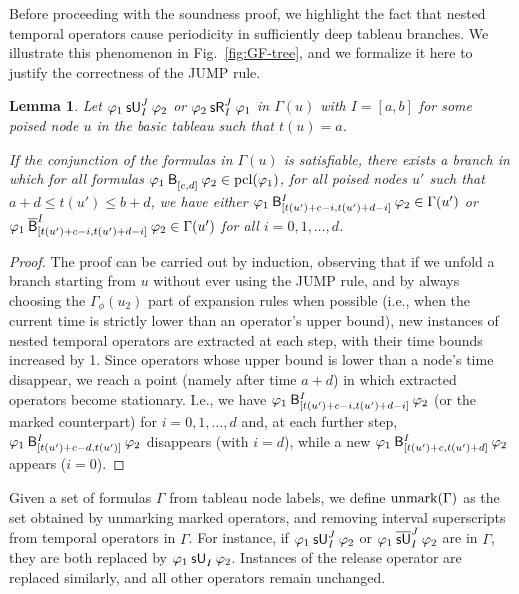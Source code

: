 \documentclass[acmsmall,screen]{acmart}
\newtheorem{lemma}{Lemma}
\begin{document}
Before proceeding with the soundness proof, we highlight the fact that nested temporal operators cause periodicity in sufficiently deep tableau branches.
We illustrate this phenomenon in Fig.~\ref{fig:GF-tree},
and we formalize it here to justify the correctness of the \textsf{JUMP} rule.
\begin{lemma}
\label{lemma:operator-ladder}
Let $\suntil[J]{I}{\varphi_1}{\varphi_2}$ or $\srelease[J]{I}{\varphi_2}{\varphi_1}$ in $\Gamma(u)$
with $I = [a,b]$ for some poised node $u$ in the basic tableau such that $t(u) = a$.

If the conjunction of the formulas in $\Gamma(u)$ is satisfiable, there exists a branch in which
for all formulas $\anybinop{[c,d]}{\varphi_1}{\varphi_2} \in \pcl(\varphi_1)$,
for all poised nodes $u'$ such that $a + d \leq t(u') \leq b + d$, we have either
$\anybinop[I]{[t(u')+c-i,t(u')+d-i]}{\varphi_1}{\varphi_2} \in \Gamma(u')$ or
$\stlbinop[I]{\marked{\mathsf{B}}}{[t(u')+c-i,t(u')+d-i]}{\varphi_1}{\varphi_2} \in \Gamma(u')$
for all $i = 0, 1, \dots, d$.
\end{lemma}
\begin{proof}
The proof can be carried out by induction, observing that if we unfold a branch starting from $u$
without ever using the \textsf{JUMP} rule,
and by always choosing the $\Gamma_\phi(u_2)$ part of expansion rules when possible
(i.e., when the current time is strictly lower than an operator's upper bound),
new instances of nested temporal operators are extracted at each step,
with their time bounds increased by 1.
Since operators whose upper bound is lower than a node's time disappear,
we reach a point (namely after time $a + d$) in which extracted operators become stationary.
I.e., we have $\anybinop[I]{[t(u')+c-i,t(u')+d-i]}{\varphi_1}{\varphi_2}$
(or the marked counterpart) for $i = 0, 1, \dots, d$ and, at each further step,
$\anybinop[I]{[t(u')+c-d,t(u')]}{\varphi_1}{\varphi_2}$ disappears (with $i = d$),
while a new $\anybinop[I]{[t(u')+c,t(u')+d]}{\varphi_1}{\varphi_2}$ appears ($i = 0$).
\end{proof}

Given a set of formulas $\Gamma$ from tableau node labels,
we define $\unmark(\Gamma)$ as the set obtained by unmarking marked operators,
and removing interval superscripts from temporal operators in $\Gamma$.
For instance, if $\suntil[J]{I}{\varphi_1}{\varphi_2}$ or $\msuntil[J]{I}{\varphi_1}{\varphi_2}$ are in $\Gamma$,
they are both replaced by $\suntil{I}{\varphi_1}{\varphi_2}$.
Instances of the release operator are replaced similarly, and all other operators remain unchanged.
\end{document}
